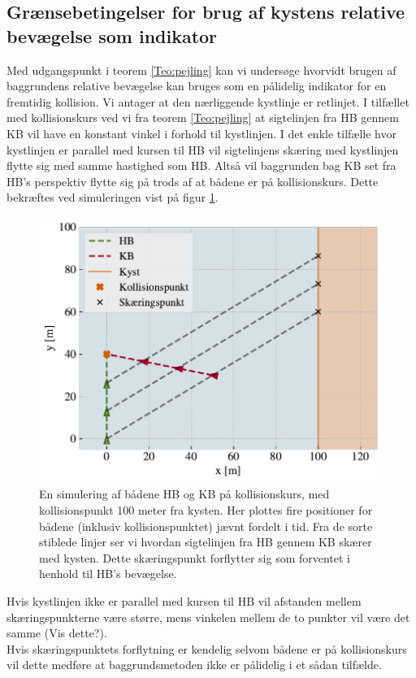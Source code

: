 \documentclass[%
 reprint,
nofootinbib,
aps,
]{revtex4-1}
\begin{document}
 \subsection{Grænsebetingelser for brug af kystens relative bevægelse som indikator}
 Med udgangspunkt i teorem \ref{Teo:pejling} kan vi undersøge hvorvidt brugen af baggrundens relative bevægelse kan bruges som en pålidelig indikator for en fremtidig kollision. Vi antager at den nærliggende kystlinje er retlinjet. I tilfællet med kollisionskurs ved vi fra teorem \ref{Teo:pejling} at sigtelinjen fra HB gennem KB vil have en konstant vinkel i forhold til kystlinjen. I det enkle tilfælle hvor kystlinjen er parallel med kursen til HB vil sigtelinjens skæring med kystlinjen flytte sig med samme hastighed som HB. Altså vil baggrunden bag KB set fra HB's perspektiv flytte sig på trods af at bådene er på kollisionskurs. Dette bekræftes ved simuleringen vist på figur \ref{fig:eks1}.
 \begin{figure}[H]
   \includegraphics[width=\linewidth]{figures/eksempel1.pdf}
   \caption{En simulering af bådene HB og KB på kollisionskurs, med kollisionspunkt 100 meter fra kysten. Her plottes fire positioner for bådene (inklusiv kollisionspunktet) jævnt fordelt i tid. Fra de sorte stiblede linjer ser vi hvordan sigtelinjen fra HB gennem KB skærer med kysten. Dette skæringspunkt forflytter sig som forventet i henhold til HB's bevægelse.}
   \label{fig:eks1}
 \end{figure}
 Hvis kystlinjen ikke er parallel med kursen til HB vil afstanden mellem skæringspunkterne være større, mens vinkelen mellem de to punkter vil være det samme (Vis dette?).\\
 Hvis skæringspunktets forflytning er kendelig selvom bådene er på kollisionskurs vil dette medføre at baggrundsmetoden ikke er pålidelig i et sådan tilfælde.
\end{document}
